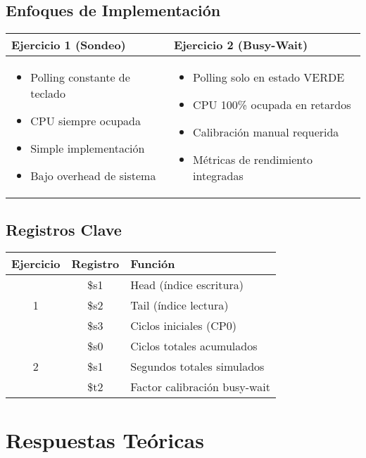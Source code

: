 \documentclass[12pt, a4paper]{article}
\begin{document}
\subsection{Enfoques de Implementación}
\begin{tabular}{|p{}|p{}|}
\toprule
\textbf{Ejercicio 1 (Sondeo)} & \textbf{Ejercicio 2 (Busy-Wait)} \\
\midrule
\begin{itemize}
    \item Polling constante de teclado
    \item CPU siempre ocupada
    \item Simple implementación
    \item Bajo overhead de sistema
\end{itemize} &
\begin{itemize}
    \item Polling solo en estado VERDE
    \item CPU 100\% ocupada en retardos
    \item Calibración manual requerida
    \item Métricas de rendimiento integradas
\end{itemize} \\
\bottomrule
\end{tabular}

\subsection{Registros Clave}
\begin{center}
\begin{tabular}{|c|c|l|}
\hline
\textbf{Ejercicio} & \textbf{Registro} & \textbf{Función} \\
\hline
\multirow{3}{*}{1} & \$s1 & Head (índice escritura) \\
                   & \$s2 & Tail (índice lectura) \\
                   & \$s3 & Ciclos iniciales (CP0) \\
\hline
\multirow{3}{*}{2} & \$s0 & Ciclos totales acumulados \\
                   & \$s1 & Segundos totales simulados \\
                   & \$t2 & Factor calibración busy-wait \\
\hline
\end{tabular}
\end{center}

\section{Respuestas Teóricas}
\end{document}
